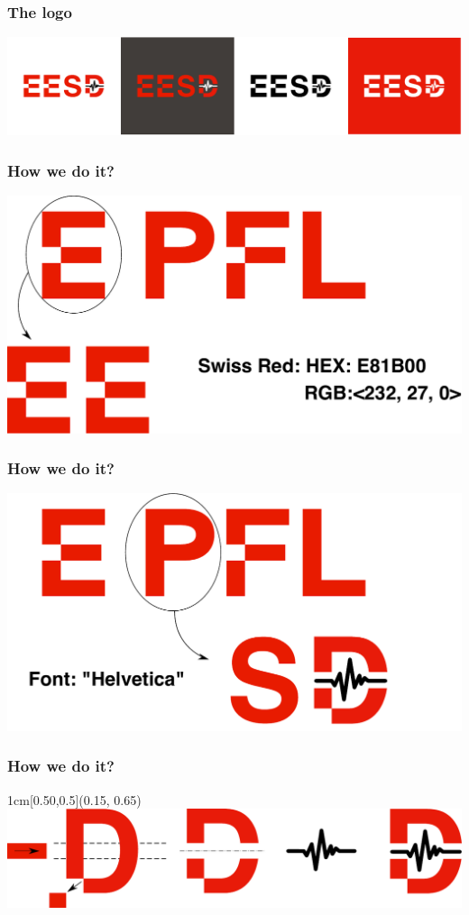 \documentclass{EESD}
\begin{document}
\begin{frame}
\frametitle{The logo}
\includegraphics[height=0.37\textheight]{EESD_different_bg.pdf}
\end{frame}

\begin{frame}
\frametitle{How we do it?}
\hspace{1.7cm}
\includegraphics[height=0.7\textheight]{EESD_how_1.pdf}
\end{frame}

\begin{frame}
\frametitle{How we do it?}
\hspace{1.7cm}
\includegraphics[height=0.7\textheight]{EESD_how_2.pdf}
\end{frame}

\begin{frame}
\frametitle{How we do it?}
\begin{textblock*}{1cm}[0.50,0.5](0.15\textwidth, 0.65\textheight)
        \includegraphics[height=0.35\textheight]{EESD_how_3.pdf}
\end{textblock*}
\end{frame}
\end{document}
